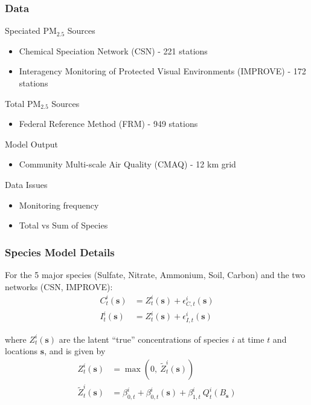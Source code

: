 \documentclass[t]{beamer}\usepackage[]{graphicx}\usepackage[]{color}
\newcommand{\PM}{$\text{PM}_{2.5}$ }
\begin{document}

\begin{frame}
\frametitle{Data}

Speciated \PM Sources
\begin{itemize}
  \item Chemical Speciation Network (CSN) - 221 stations
  \item Interagency Monitoring of Protected Visual Environments (IMPROVE) - 172 stations
\end{itemize}

\vspace{1mm}

Total \PM Sources
\begin{itemize}
  \item Federal Reference Method (FRM) - 949 stations
\end{itemize}

\vspace{1mm}

Model Output
\begin{itemize}
  \item Community Multi-scale Air Quality (CMAQ) - 12 km grid
\end{itemize}

\vspace{1mm}

Data Issues
\begin{itemize}
  \item Monitoring frequency
  \item Total vs Sum of Species
\end{itemize}

\end{frame}



\begin{frame}
\frametitle{Species Model Details}

For the 5 major species (Sulfate, Nitrate, Ammonium, Soil, Carbon) and the two networks (CSN, IMPROVE):
%
\begin{align*}
C_t^i(\bm{s}) &= Z_t^i(\bm{s}) + \epsilon_{C,t}^i(\bm{s}) \\
I_t^i(\bm{s}) &= Z_t^i(\bm{s}) + \epsilon_{I,t}^i(\bm{s})
\end{align*}

where $Z_t^i(\bm{s})$ are the latent ``true'' concentrations of species $i$ at time $t$ and locations $\bm{s}$, and is given by
%
\begin{align*}
{Z}_t^i(\bm{s}) &= \max{}\left(0,~\widetilde{Z}_t^i(\bm{s})\right) \\
\widetilde{Z}_t^i(\bm{s}) &= \beta_{0,t}^i +\beta_{0,t}^i(\bm{s}) + \beta_{1,t}^i \: Q_t^i(B_{\bm{s}})  
\end{align*}


\end{frame}
\end{document}
